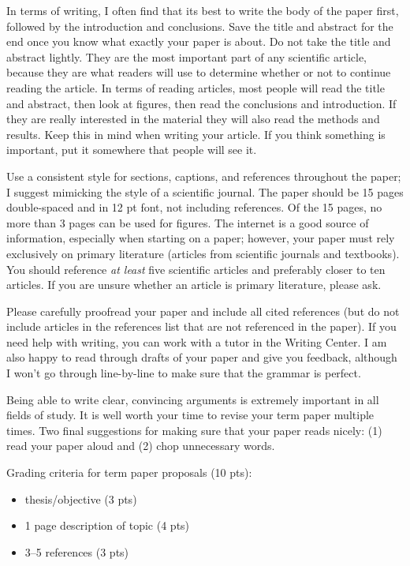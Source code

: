 \documentclass[11pt,letterpaper]{article}
\newcommand{\squeezeup}{\vspace{-2.5mm}}
\begin{document}
In terms of writing, I often find that its best to write the body of the paper first, followed by the introduction and conclusions. Save the title and abstract for the end once you know what exactly your paper is about. Do not take the title and abstract lightly. They are the most important part of any scientific article, because they are what readers will use to determine whether or not to continue reading the article. In terms of reading articles, most people will read the title and abstract, then look at figures, then read the conclusions and introduction. If they are really interested in the material they will also read the methods and results. Keep this in mind when writing your article. If you think something is important, put it somewhere that people will see it.

Use a consistent style for sections, captions, and references throughout the paper; I suggest mimicking the style of a scientific journal. The paper should be 15 pages double-spaced and in 12 pt font, not including references. Of the 15 pages, no more than 3 pages can be used for figures. The internet is a good source of information, especially when starting on a paper; however, your paper must rely exclusively on primary literature (articles from scientific journals and textbooks). You should reference \textit{at least} five scientific articles and preferably closer to ten articles. If you are unsure whether an article is primary literature, please ask.

Please carefully proofread your paper and include all cited references (but do not include articles in the references list that are not referenced in the paper). If you need help with writing, you can work with a tutor in the Writing Center. I am also happy to read through drafts of your paper and give you feedback, although I won't go through line-by-line to make sure that the grammar is perfect.

Being able to write clear, convincing arguments is extremely important in all fields of study. It is well worth your time to revise your term paper multiple times. Two final suggestions for making sure that your paper reads nicely: (1) read your paper aloud and (2) chop unnecessary words.

\clearpage
\hrulefill

Grading criteria for term paper proposals (10 pts):

\begin{itemize}\itemsep -5pt \squeezeup
  \item thesis/objective (3 pts)
  \item 1 page description of topic (4 pts)
  \item 3--5 references (3 pts)
\end{itemize}
\end{document}
